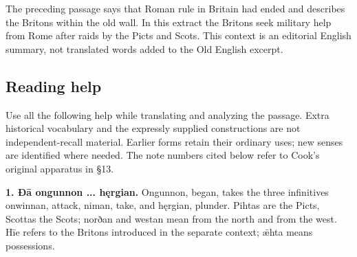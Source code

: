 The preceding passage says that Roman rule in Britain had ended and describes the Britons within the old wall. In this extract the Britons seek military help from Rome after raids by the Picts and Scots. This context is an editorial English summary, not translated words added to the Old English excerpt.

\par\begin{minipage}{\linewidth}\raggedright


\end{minipage}\par
{}
\subsection*{Reading help}

Use all the following help while translating and analyzing the passage. Extra historical vocabulary and the expressly supplied constructions are not independent-recall material. Earlier forms retain their ordinary uses; new senses are identified where needed. The note numbers cited below refer to Cook’s original apparatus in §13.

\textbf{1. Ðā ongunnon ... hęrgian.} Ongunnon, began, takes the three infinitives onwinnan, attack, niman, take, and hęrgian, plunder. Pihtas are the Picts, Scottas the Scots; norðan and westan mean from the north and from the west. Hīe refers to the Britons introduced in the separate context; ǣhta means possessions.

